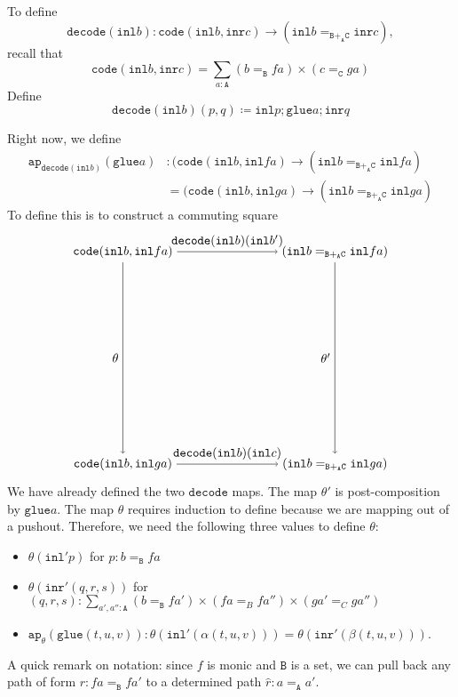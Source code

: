 \documentclass[12pt]{amsart}
\newcommand{\from}{\colon}
\newcommand{\bydef}{\coloneqq}
\newcommand{\type}[1]{\mathtt{#1}}
\newcommand{\tin}{\colon}
\newcommand{\A}{\type{A}}
\newcommand{\B}{\type{B}}
\newcommand{\C}{\type{C}}
\newcommand{\BAC}{\B +_{\A} \C}
\newcommand{\ap}{\type{ap}}
\newcommand{\inl}{\type{inl}}
\newcommand{\inr}{\type{inr}}
\newcommand{\glue}{\type{glue}}
\newcommand{\code}{\type{code}}
\newcommand{\decode}{\type{decode}}
\theoremstyle{remark}
\theoremstyle{definition}
\begin{document}

To define
\[
  \decode ( \inl b ) \from
  \code ( \inl b , \inr c ) \to
  ( \inl b =_{\BAC} \inr c ),
\]
recall that
\[
  \code ( \inl b , \inr c ) =
  \sum\limits_{a \tin \A} (b =_{\B} fa) \times (c =_{\C} ga)
\]
Define
\[
  \decode ( \inl b ) ( p , q ) \bydef
  \inl p ; \glue a ; \inr q
\]


Right now, we define
%
\begin{align*}
  \ap_{\decode ( \inl b ) } (\glue a) & \tin
  ( \code ( \inl b , \inl fa ) \to ( \inl b =_{\BAC} \inl fa ) \\
  & =
  ( \code ( \inl b , \inl ga ) \to ( \inl b =_{\BAC} \inl ga )
\end{align*}
%
To define this is to construct a commuting square
\[
\begin{tikzpicture}
  \node (1) at (-3,3)
    {\( \code ( \inl b , \inl fa ) \)};
  \node (2) at (-3,-3)
    {\( \code ( \inl b , \inl ga ) \)};
  \node (3) at (3,3)
    {\( ( \inl b =_{\BAC} \inl fa ) \)};
  \node (4) at (3,-3)
    {\( ( \inl b =_{\BAC} \inl ga ) \)};
  \draw [->] (1) to node [left]
    {\( \theta \)} (2);
  \draw [->] (1) to node [above]
    {\( \decode (\inl b )(\inl b') \)} (3);
  \draw [->] (3) to node [left]
    {\( \theta' \)} (4);
  \draw [->] (2) to node [above]
    {\( \decode (\inl b )(\inl c) \)} (4);
\end{tikzpicture}
\]
We have already defined the two \( \decode \) maps. The map \( \theta'
\) is post-composition by \( \glue a \). The map \( \theta \) requires
induction to define because we are mapping out of a pushout.
Therefore, we need the following three values to define \( \theta \):
\begin{itemize}
\item
  \(
    \theta (\inl' p)
  \)
  for
  \(
    p \tin b =_\B fa
  \)
\item
  \(
    \theta ( \inr' (q,r,s) )
  \)
  for
  \(
    (q,r,s) \tin
      \sum\limits_{a',a'' \tin \A}
      (b=_\B fa') \times (fa =_B fa'') \times (ga' =_C ga'')
  \) 
\item
  \(
    \ap_{ \theta } ( \glue (t,u,v) ) \tin
      \theta ( \inl' (\alpha (t,u,v) ) ) =
      \theta ( \inr' ( \beta (t,u,v) ) )
  \).
\end{itemize}

A quick remark on notation: since \( f \) is monic and \( \B \) is a
set, we can pull back any path of form \( r \tin fa =_\B fa'\) to a
determined path
\(
  \hat{r} \tin a =_\A a'.
\)
\end{document}
